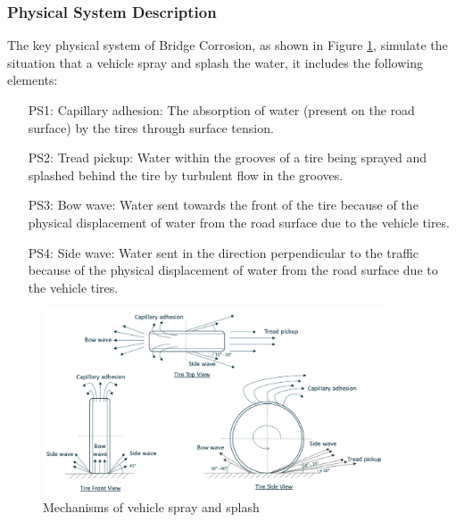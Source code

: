 \documentclass[12pt]{article}
\begin{document}
\subsubsection{Physical System Description} \label{sec_phySystDescrip}


The key physical system of Bridge Corrosion, as shown in Figure \ref{4mechanism}, simulate the situation that a vehicle spray and splash the water, it includes the following elements:

\begin{itemize}

\item[PS1:] Capillary adhesion: The absorption of water (present on the road surface) by the tires through surface tension.

\item[PS2:] Tread pickup: Water within the grooves of a tire being sprayed and splashed behind the tire by turbulent flow in the grooves.

\item[PS3:] Bow wave: Water sent towards the front of the tire because of the physical displacement of water from the road surface due to the vehicle tires.

\item[PS4:] Side wave: Water sent in the direction perpendicular to the traffic because of the physical displacement of water from the road surface due to the vehicle tires.

\end{itemize}


\begin{figure}[h!]
\begin{center}
\includegraphics[width=0.9\textwidth]{phymodel}
\caption{\label{4mechanism} Mechanisms of vehicle spray and splash}

\end{center}
\end{figure}
\end{document}

